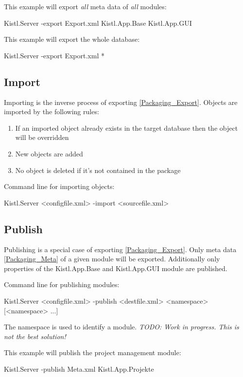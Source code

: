 This example will export \emph{all} meta data of \emph{all} modules:
\begin{CS}
Kistl.Server -export Export.xml Kistl.App.Base Kistl.App.GUI
\end{CS}

This example will export the whole database:
\begin{CS}
Kistl.Server -export Export.xml *
\end{CS}

\subsection{\label{Packaging_Import}Import}

Importing is the inverse process of exporting \ref{Packaging_Export}. Objects are imported by the following rules:

\begin{enumerate}
 \item If an imported object already exists in the target database then the object will be overridden
 \item New objects are added
 \item No object is deleted if it's not contained in the package
\end{enumerate}

Command line for importing objects:
\begin{CS}
Kistl.Server <configfile.xml> -import <sourcefile.xml>
\end{CS}

\subsection{\label{Packaging_Publish}Publish}

Publishing is a special case of exporting \ref{Packaging_Export}. Only meta data \ref{Packaging_Meta} of a given module will be exported. 
Additionally only properties of the Kistl.App.Base and Kistl.App.GUI module are published.

Command line for publishing modules:
\begin{CS}
Kistl.Server <configfile.xml> -publish <destfile.xml> <namespace> [<namespace> ...]
\end{CS}

The namespace is used to identify a module. \emph{TODO: Work in progress. This is not the best solution!}
\par

This example will publish the project management module:
\begin{CS}
Kistl.Server -publish Meta.xml Kistl.App.Projekte
\end{CS}

